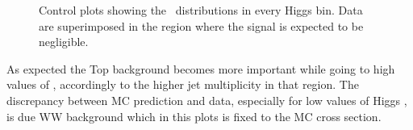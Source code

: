 \begin{figure}[htb]
\caption{Control plots showing the \mll~distributions in every Higgs \pt bin. Data are superimposed in the region where the signal is expected to be negligible.}\label{fig:control_plots}
\end{figure}

As expected the Top background becomes more important while going to high values of \pth, accordingly to the higher jet multiplicity in that region. The discrepancy between MC prediction and data, especially for low values of Higgs \pt, is due WW background which in this plots is fixed to the MC cross section.


